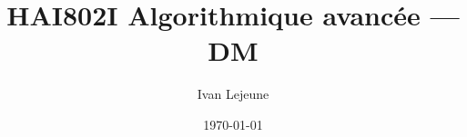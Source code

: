 








\title{\color{astral} \sffamily \bfseries HAI802I Algorithmique avancée --- DM}
\author{Ivan Lejeune}
\date{\today}

\toggletrue{showsolutions} %


    \maketitle
    \tableofcontents

    \newpage
    \setcounter{tdcounter}{0}
    
    



